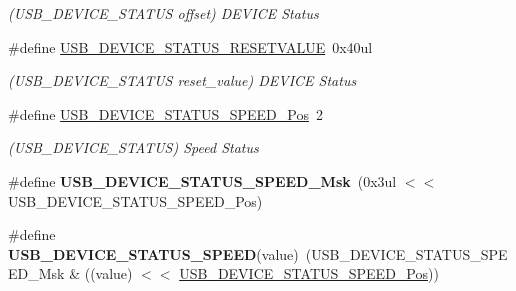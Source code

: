\begin{DoxyCompactItemize}
\begin{DoxyCompactList}\small\item\em (U\+S\+B\+\_\+\+D\+E\+V\+I\+C\+E\+\_\+\+S\+T\+A\+T\+U\+S offset) D\+E\+V\+I\+C\+E Status \end{DoxyCompactList}\item 
\hypertarget{group___s_a_m_l21___u_s_b_ga672a42f6e6eb922ae920db9f89402ace}{}\#define \hyperlink{group___s_a_m_l21___u_s_b_ga672a42f6e6eb922ae920db9f89402ace}{U\+S\+B\+\_\+\+D\+E\+V\+I\+C\+E\+\_\+\+S\+T\+A\+T\+U\+S\+\_\+\+R\+E\+S\+E\+T\+V\+A\+L\+U\+E}~0x40ul\label{group___s_a_m_l21___u_s_b_ga672a42f6e6eb922ae920db9f89402ace}

\begin{DoxyCompactList}\small\item\em (U\+S\+B\+\_\+\+D\+E\+V\+I\+C\+E\+\_\+\+S\+T\+A\+T\+U\+S reset\+\_\+value) D\+E\+V\+I\+C\+E Status \end{DoxyCompactList}\item 
\hypertarget{group___s_a_m_l21___u_s_b_ga07dc661773fbafdaa2c54728657332bd}{}\#define \hyperlink{group___s_a_m_l21___u_s_b_ga07dc661773fbafdaa2c54728657332bd}{U\+S\+B\+\_\+\+D\+E\+V\+I\+C\+E\+\_\+\+S\+T\+A\+T\+U\+S\+\_\+\+S\+P\+E\+E\+D\+\_\+\+Pos}~2\label{group___s_a_m_l21___u_s_b_ga07dc661773fbafdaa2c54728657332bd}

\begin{DoxyCompactList}\small\item\em (U\+S\+B\+\_\+\+D\+E\+V\+I\+C\+E\+\_\+\+S\+T\+A\+T\+U\+S) Speed Status \end{DoxyCompactList}\item 
\hypertarget{group___s_a_m_l21___u_s_b_gaf9ce0bc540950eeba6474753552ff095}{}\#define {\bfseries U\+S\+B\+\_\+\+D\+E\+V\+I\+C\+E\+\_\+\+S\+T\+A\+T\+U\+S\+\_\+\+S\+P\+E\+E\+D\+\_\+\+Msk}~(0x3ul $<$$<$ U\+S\+B\+\_\+\+D\+E\+V\+I\+C\+E\+\_\+\+S\+T\+A\+T\+U\+S\+\_\+\+S\+P\+E\+E\+D\+\_\+\+Pos)\label{group___s_a_m_l21___u_s_b_gaf9ce0bc540950eeba6474753552ff095}

\item 
\hypertarget{group___s_a_m_l21___u_s_b_gab9e22147b510dbd1f47f453396b45c1b}{}\#define {\bfseries U\+S\+B\+\_\+\+D\+E\+V\+I\+C\+E\+\_\+\+S\+T\+A\+T\+U\+S\+\_\+\+S\+P\+E\+E\+D}(value)~(U\+S\+B\+\_\+\+D\+E\+V\+I\+C\+E\+\_\+\+S\+T\+A\+T\+U\+S\+\_\+\+S\+P\+E\+E\+D\+\_\+\+Msk \& ((value) $<$$<$ \hyperlink{group___s_a_m_l21___u_s_b_ga07dc661773fbafdaa2c54728657332bd}{U\+S\+B\+\_\+\+D\+E\+V\+I\+C\+E\+\_\+\+S\+T\+A\+T\+U\+S\+\_\+\+S\+P\+E\+E\+D\+\_\+\+Pos}))\label{group___s_a_m_l21___u_s_b_gab9e22147b510dbd1f47f453396b45c1b}


\end{DoxyCompactItemize}
